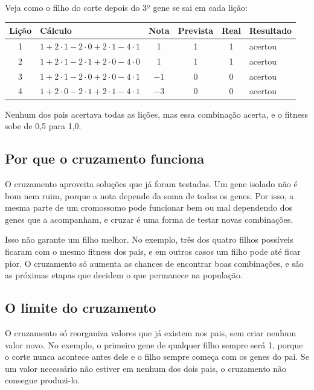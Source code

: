 \documentclass[11pt,a4paper]{article}
\newenvironment{tabela}{\par\nopagebreak[4]\vspace{0.3em}\nopagebreak[4]\begingroup\centering\small}{\par\endgroup\vspace{0.6em}}
\begin{document}
Veja como o filho do corte depois do 3º gene se sai em cada lição:

\begin{tabela}
\begin{tabular}{clcccl}
\toprule
Lição & Cálculo & Nota & Prevista & Real & Resultado\\
\midrule
1 & $1 + 2\cdot1 - 2\cdot0 + 2\cdot1 - 4\cdot1$ & 1 & 1 & 1 & acertou\\
2 & $1 + 2\cdot1 - 2\cdot1 + 2\cdot0 - 4\cdot0$ & 1 & 1 & 1 & acertou\\
3 & $1 + 2\cdot1 - 2\cdot0 + 2\cdot0 - 4\cdot1$ & $-1$ & 0 & 0 & acertou\\
4 & $1 + 2\cdot0 - 2\cdot1 + 2\cdot1 - 4\cdot1$ & $-3$ & 0 & 0 & acertou\\
\bottomrule
\end{tabular}
\end{tabela}

Nenhum dos pais acertava todas as lições, mas essa combinação acerta, e o fitness sobe de 0,5 para 1,0.

\subsection{Por que o cruzamento funciona}

O cruzamento aproveita soluções que já foram testadas. Um gene isolado não é bom nem ruim, porque a nota depende da soma de todos os genes. Por isso, a mesma parte de um cromossomo pode funcionar bem ou mal dependendo dos genes que a acompanham, e cruzar é uma forma de testar novas combinações.

Isso não garante um filho melhor. No exemplo, três dos quatro filhos possíveis ficaram com o mesmo fitness dos pais, e em outros casos um filho pode até ficar pior. O cruzamento só aumenta as chances de encontrar boas combinações, e são as próximas etapas que decidem o que permanece na população.

\subsection{O limite do cruzamento}

O cruzamento só reorganiza valores que já existem nos pais, sem criar nenhum valor novo. No exemplo, o primeiro gene de qualquer filho sempre será 1, porque o corte nunca acontece antes dele e o filho sempre começa com os genes do pai. Se um valor necessário não estiver em nenhum dos dois pais, o cruzamento não consegue produzi-lo.
\end{document}
